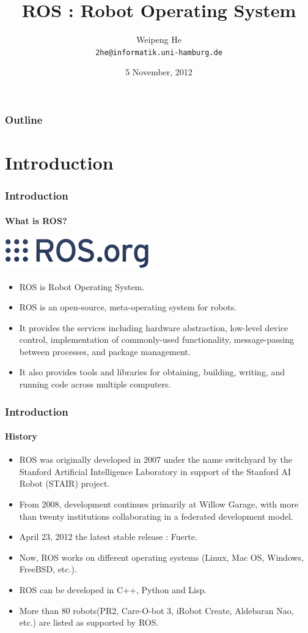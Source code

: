 \documentclass{beamer}
\title{ROS : Robot Operating System}
\author{Weipeng He \\ \texttt{2he@informatik.uni-hamburg.de}}
\date{5 November, 2012}
\begin{document}
\frame{\titlepage}

\begin{frame}
\frametitle{Outline}
\tableofcontents
\end{frame}

\section{Introduction}
\begin{frame}
\frametitle{Introduction}
\framesubtitle{What is ROS?}
\begin{center}
  \includegraphics[width=.4\textwidth]{ros_org}
\end{center}
\begin{itemize}
  \item ROS is Robot Operating System.
  \item ROS is an open-source, meta-operating system for robots.
  \item It provides the services including hardware abstraction, low-level device control, implementation of commonly-used functionality, message-passing between processes, and package management.
  \item It also provides tools and libraries for obtaining, building, writing, and running code across multiple computers.
\end{itemize}
\end{frame}

\begin{frame}
\frametitle{Introduction}
\framesubtitle{History}
\begin{itemize}
  \item ROS was originally developed in 2007 under the name switchyard by the Stanford Artificial Intelligence Laboratory in support of the Stanford AI Robot (STAIR) project.
  \item From 2008, development continues primarily at Willow Garage, with more than twenty institutions collaborating in a federated development model.
  \item April 23, 2012 the latest stable release : Fuerte.
  \item Now, ROS works on different operating systems (Linux, Mac OS, Windows, FreeBSD, etc.).
  \item ROS can be developed in C++, Python and Lisp.
  \item More than 80 robots(PR2, Care-O-bot 3, iRobot Create, Aldebaran Nao, etc.) are listed as supported by ROS.
\end{itemize}
\end{frame}
\end{document}
